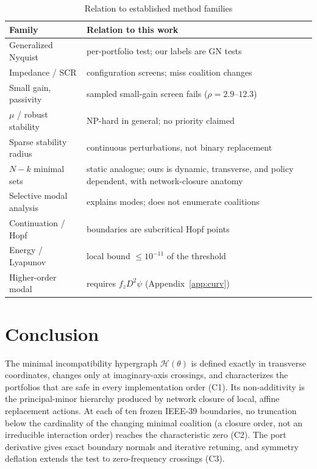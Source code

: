 \documentclass[journal]{IEEEtran}
\theoremstyle{definition}
\theoremstyle{remark}
\newcommand{\Hy}{\mathcal{H}}
\begin{document}
\begin{table}[!t]
\centering
\caption{Relation to established method families}\label{tab:methods}
\setlength{\tabcolsep}{2.5pt}
\footnotesize
\begin{tabular}{@{}L{0.30\columnwidth}L{0.64\columnwidth}@{}}
\toprule
Family & Relation to this work \\
\midrule
Generalized Nyquist \cite{macfarlane1977gnc} & per-portfolio test; our labels are GN tests \\
Impedance / SCR \cite{sun2011impedance, xin2016gscr} & configuration screens; miss coalition changes \\
Small gain, passivity & sampled small-gain screen fails ($\rho=2.9$--$12.3$) \\
$\mu$ / robust stability \cite{poljak1993robust} & NP-hard in general; no priority claimed \\
Sparse stability radius \cite{katewa2020sparse} & continuous perturbations, not binary replacement \\
$N\!-\!k$ minimal sets \cite{bienstock2010nk} & static analogue; ours is dynamic, transverse, and policy dependent, with network-closure anatomy \\
Selective modal analysis \cite{perezarriaga1982sma} & explains modes; does not enumerate coalitions \\
Continuation / Hopf \cite{kuznetsov2004bifurcation} & boundaries are subcritical Hopf points \\
Energy / Lyapunov & local bound $\le10^{-11}$ of the threshold \\
Higher-order modal \cite{sanchezgasca2005higher} & requires $f_zD^2\psi$ (Appendix~\ref{app:curv}) \\
\bottomrule
\end{tabular}
\end{table}

\section{Conclusion}
The minimal incompatibility hypergraph $\Hy(\theta)$ is defined exactly in
transverse coordinates, changes only at imaginary-axis crossings, and
characterizes the portfolios that are safe in every implementation order (C1).
Its non-additivity is the principal-minor hierarchy produced by network
closure of local, affine replacement actions. At each of ten frozen IEEE-39
boundaries, no truncation below the cardinality of the changing minimal
coalition (a closure order, not an irreducible interaction order) reaches the
characteristic zero (C2). The port derivative gives
exact boundary normals and iterative retuning, and symmetry deflation extends
the test to zero-frequency crossings (C3).
\end{document}
